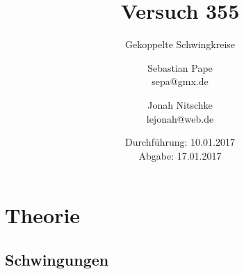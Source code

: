 

\title{Versuch 355}
\subtitle{Gekoppelte Schwingkreise}
\author{Sebastian Pape\\
        sepa@gmx.de \and
        Jonah Nitschke\\
        lejonah@web.de}
\date{Durchführung: 10.01.2017\\
      Abgabe: 17.01.2017}


\maketitle
\setcounter{page}{1}

\section{Theorie}

\subsection{Schwingungen}




